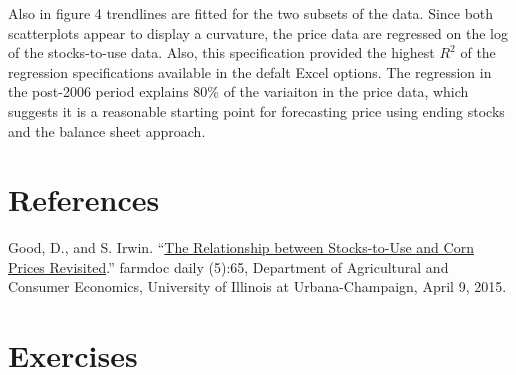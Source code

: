\documentclass[
]{book}
\begin{document}
Also in figure 4 trendlines are fitted for the two subsets of the data. Since both scatterplots appear to display a curvature, the price data are regressed on the log of the stocks-to-use data. Also, this specification provided the highest \(R^2\) of the regression specifications available in the defalt Excel options. The regression in the post-2006 period explains 80\% of the variaiton in the price data, which suggests it is a reasonable starting point for forecasting price using ending stocks and the balance sheet approach.

\hypertarget{references}{%
\section{References}\label{references}}

Good, D., and S. Irwin. ``\href{http://farmdocdaily.illinois.edu/2015/04/relationship-stock-to-use-and-corn-prices.html}{The Relationship between Stocks-to-Use and Corn Prices Revisited}.'' farmdoc daily (5):65, Department of Agricultural and Consumer Economics, University of Illinois at Urbana-Champaign, April 9, 2015.

\hypertarget{exercises-5}{%
\section{Exercises}\label{exercises-5}}
\end{document}

